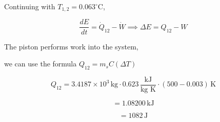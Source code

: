 Continuing with \(T_{1,2} = 0.063^\circ \text{C}\),

\[
\frac{dE}{dt} = \dot{Q}_{12} - \dot{W} \implies \Delta E = Q_{12} - W
\]

The piston performs work into the system,

we can use the formula \(Q_{12} = m_s C (\Delta T)\)

\[
Q_{12} = 3.4187 \times 10^3 \, \text{kg} \cdot 0.623 \, \frac{\text{kJ}}{\text{kg K}} \cdot (500 - 0.003) \, \text{K}
\]

\[
= 1.08200 \, \text{kJ}
\]

\[
= 1082 \, \text{J}
\]